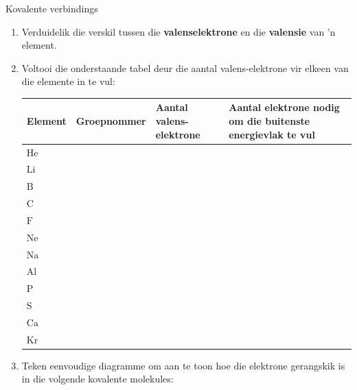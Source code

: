             \begin{exercises}{Kovalente verbindings}
            \nopagebreak
        \label{m38704*id139588}\begin{enumerate}[noitemsep, label=\textbf{\arabic*}. ] 
            \label{m38704*uid10}\item Verduidelik die verskil tussen die \textbf{valenselektrone} en die \textbf{valensie} van 'n  element.
\label{m38704*uid11}\item Voltooi die onderstaande tabel deur die aantal valens-elektrone vir elkeen van die elemente in te vul:
          \begin{table}[H]
        \begin{center}
      \label{m38704*id139625}
    \noindent
      \begin{tabular}{|l|l|p{3cm}|p{3cm}|}\hline
\textbf{Element} & \textbf{Groepnommer} & \textbf{Aantal valens-elektrone} & \textbf{Aantal elektrone nodig om die buitenste energievlak te vul}  \\ \hline
        $\text{He}$ & & & \\ \hline
        $\text{Li}$ & & & \\ \hline
        $\text{B}$ & & & \\ \hline
        $\text{C}$ & & & \\ \hline
        $\text{F}$ & & & \\ \hline
        $\text{Ne}$ & & & \\ \hline
        $\text{Na}$ & & & \\ \hline
        $\text{Al}$ & & & \\ \hline
        $\text{P}$ & & & \\ \hline
        $\text{S}$ & & & \\ \hline
        $\text{Ca}$ & & & \\ \hline
        $\text{Kr}$ & & & \\ \hline
    \end{tabular}
      \end{center}
\end{table}
          \label{m38704*uid12}\item Teken eenvoudige diagramme om aan te toon hoe die elektrone gerangskik is in die volgende kovalente molekules:
\label{m38704*id140030}\begin{enumerate}[noitemsep, label=\textbf{\alph*}. ] 

\end{enumerate}
\end{enumerate}
\end{exercises}
